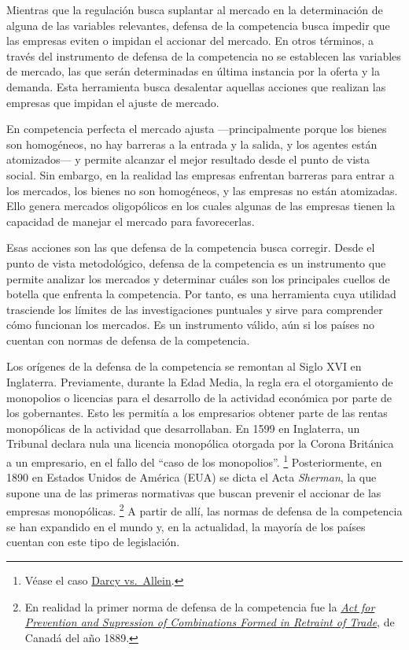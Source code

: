 \documentclass[
  12pt,
  spanish,
]{book}
\begin{document}
Mientras que la regulación busca suplantar al mercado en la determinación de alguna de las variables relevantes, defensa de la competencia busca impedir que las empresas eviten o impidan el accionar del mercado. En otros términos, a través del instrumento de defensa de la competencia no se establecen las variables de mercado, las que serán determinadas en última instancia por la oferta y la demanda. Esta herramienta busca desalentar aquellas acciones que realizan las empresas que impidan el ajuste de mercado.

En competencia perfecta el mercado ajusta ---principalmente porque los bienes son homogéneos, no hay barreras a la entrada y la salida, y los agentes están atomizados--- y permite alcanzar el mejor resultado desde el punto de vista social. Sin embargo, en la realidad las empresas enfrentan barreras para entrar a los mercados, los bienes no son homogéneos, y las empresas no están atomizadas. Ello genera mercados oligopólicos en los cuales algunas de las empresas tienen la capacidad de manejar el mercado para favorecerlas.

Esas acciones son las que defensa de la competencia busca corregir. Desde el punto de vista metodológico, defensa de la competencia es un instrumento que permite analizar los mercados y determinar cuáles son los principales cuellos de botella que enfrenta la competencia. Por tanto, es una herramienta cuya utilidad trasciende los límites de las investigaciones puntuales y sirve para comprender cómo funcionan los mercados. Es un instrumento válido, aún si los países no cuentan con normas de defensa de la competencia.

Los orígenes de la defensa de la competencia se remontan al Siglo XVI en Inglaterra. Previamente, durante la Edad Media, la regla era el otorgamiento de monopolios o licencias para el desarrollo de la actividad económica por parte de los gobernantes. Esto les permitía a los empresarios obtener parte de las rentas monopólicas de la actividad que desarrollaban. En 1599 en Inglaterra, un Tribunal declara nula una licencia monopólica otorgada por la Corona Británica a un empresario, en el fallo del ``caso de los monopolios''.
\footnote{Véase el caso \href{https://en.wikipedia.org/wiki/Darcy_v_Allein}{Darcy vs.~Allein}.}
Posteriormente, en 1890 en Estados Unidos de América (EUA) se dicta el Acta \emph{Sherman}, la que supone una de las primeras normativas que buscan prevenir el accionar de las empresas monopólicas.
\footnote{En realidad la primer norma de defensa de la competencia fue la \emph{\href{https://www.competitionbureau.gc.ca/eic/site/cb-bc.nsf/eng/04427.html}{Act for Prevention and Supression of Combinations Formed in Retraint of Trade}}, de Canadá del año 1889.}
A partir de allí, las normas de defensa de la competencia se han expandido en el mundo y, en la actualidad, la mayoría de los países cuentan con este tipo de legislación.
\end{document}
